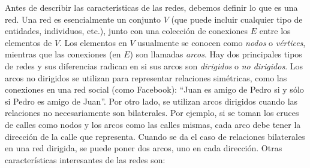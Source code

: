 \documentclass[12pt]{report}
\begin{document}
Antes de describir las características de las redes, debemos definir lo que es una red. Una red es esencialmente un conjunto $V$ (que puede incluir cualquier tipo de entidades, individuos, etc.), junto con una colección de conexiones $E$ entre los elementos de $V$. Los elementos en $V$ usualmente se conocen como \emph{nodos} o \emph{vértices}, mientras que las conexiones (en $E$) son llamadas \emph{arcos}. Hay dos principales tipos de redes y sus diferencias radican en si sus arcos son \emph{dirigidos} o \emph{no dirigidos}. Los arcos no dirigidos se utilizan para representar relaciones simétricas, como las conexiones en una red social (como Facebook): ``Juan es amigo de Pedro si y sólo si Pedro es amigo de Juan''. Por otro lado, se utilizan arcos dirigidos cuando las relaciones no necesariamente son bilaterales. Por ejemplo, si se toman los cruces de calles como nodos y los arcos como las calles mismas, cada arco debe tener la dirección de la calle que representa. Cuando se da el caso de relaciones bilaterales en una red dirigida, se puede poner dos arcos, uno en cada dirección. Otras características interesantes de las redes son:
\end{document}
